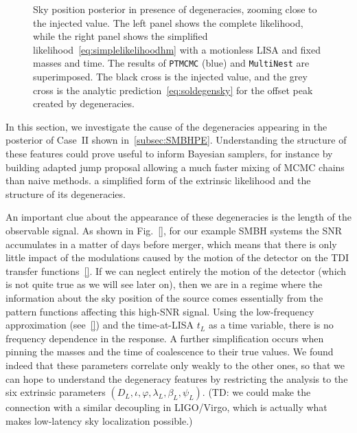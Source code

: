 \documentclass[aps,showpacs,twocolumn,prd,superscriptaddress,nofootinbib]{revtex4-1}
\newcommand\betaL{{\beta_{L}}}
\newcommand\lambdaL{{\lambda_{L}}}
\newcommand\psiL{{\psi_{L}}}
\newcommand{\tdc}[1]{{\color{red} (TD: #1)}}
\begin{document}
\begin{figure}
\begin{minipage}{.49\linewidth}
  \end{minipage}
  \caption{Sky position posterior in presence of degeneracies, zooming close to the injected value. The left panel shows the complete likelihood, while the right panel shows the simplified likelihood~\eqref{eq:simplelikelihoodhm} with a motionless LISA and fixed masses and time. The results of \texttt{PTMCMC} (blue) and \texttt{MultiNest} are superimposed. The black cross is the injected value, and the grey cross is the analytic prediction~\eqref{eq:soldegensky} for the offset peak created by degeneracies.}
  \label{fig:Skydownsmbh22hmSimpleLikeCase9}
\end{figure}

In this section, we investigate the cause of the degeneracies appearing in the posterior of Case~II shown in~\ref{subsec:SMBHPE}. Understanding the structure of these features could prove useful to inform Bayesian samplers, for instance by building adapted jump proposal allowing a much faster mixing of MCMC chains than naive methods. a simplified form of the extrinsic likelihood and the structure of its degeneracies.

An important clue about the appearance of these degeneracies is the length of the observable signal. As shown in Fig.~\ref{}, for our example SMBH systems the SNR accumulates in a matter of days before merger, which means that there is only little impact of the modulations caused by the motion of the detector on the TDI transfer functions~\eqref{}. If we can neglect entirely the motion of the detector (which is not quite true as we will see later on), then we are in a regime where the information about the sky position of the source comes essentially from the pattern functions affecting this high-SNR signal. Using the low-frequency approximation (see~\ref{}) and the time-at-LISA $t_{L}$ as a time variable, there is no frequency dependence in the response. A further simplification occurs when pinning the masses and the time of coalescence to their true values. We found indeed that these parameters correlate only weakly to the other ones, so that we can hope to understand the degeneracy features by restricting the analysis to the six extrinsic parameters $(D_{L}, \iota, \varphi, \lambdaL, \betaL, \psiL)$. \tdc{we could make the connection with a similar decoupling in LIGO/Virgo, which is actually what makes low-latency sky localization possible.}
\end{document}
